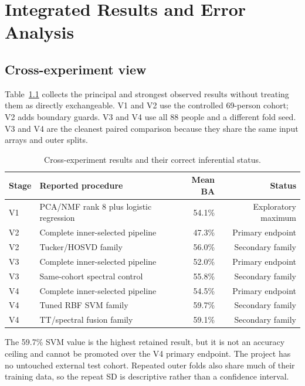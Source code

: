 \chapter{Integrated Results and Error Analysis}
\label{ch:results}

\section{Cross-experiment view}

Table~\ref{tab:cross-experiment} collects the principal and strongest observed
results without treating them as directly exchangeable. V1 and V2 use the
controlled 69-person cohort; V2 adds boundary guards. V3 and V4 use all 88
people and a different fold seed. V3 and V4 are the cleanest paired comparison
because they share the same input arrays and outer splits.

\begin{table}[htbp]
\centering
\small
\begin{tabularx}{\textwidth}{lXrr}
\toprule
\textbf{Stage} & \textbf{Reported procedure} & \textbf{Mean BA} & \textbf{Status}\\
\midrule
V1 & PCA/NMF rank 8 plus logistic regression & 54.1\% & Exploratory maximum\\
V2 & Complete inner-selected pipeline & 47.3\% & Primary endpoint\\
V2 & Tucker/HOSVD family & 56.0\% & Secondary family\\
V3 & Complete inner-selected pipeline & 52.0\% & Primary endpoint\\
V3 & Same-cohort spectral control & 55.8\% & Secondary family\\
V4 & Complete inner-selected pipeline & 54.5\% & Primary endpoint\\
V4 & Tuned RBF SVM family & 59.7\% & Secondary family\\
V4 & TT/spectral fusion family & 59.1\% & Secondary family\\
\bottomrule
\end{tabularx}
\caption{Cross-experiment results and their correct inferential status.}
\label{tab:cross-experiment}
\end{table}



The 59.7\% SVM value is the highest retained result, but it is not an accuracy
ceiling and cannot be promoted over the V4 primary endpoint. The project has no
untouched external test cohort. Repeated outer folds also share much of their
training data, so the repeat SD is descriptive rather than a confidence
interval.

